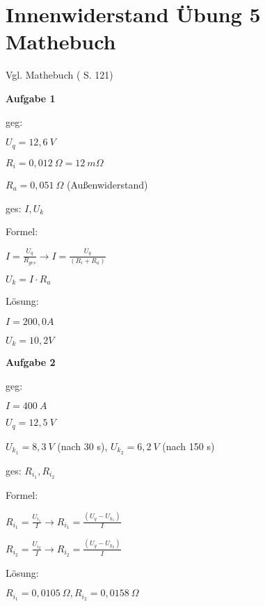 \section{Innenwiderstand Übung 5
Mathebuch}\label{innenwiderstand-uebung-5-mathebuch}

Vgl. Mathebuch (\textcite{elbl:2016:technMa} S. 121)

\textbf{Aufgabe 1}

geg:

$U_q = 12,6~V$

$R_i = 0,012~\Omega = 12~m\Omega$

$R_a = 0,051~\Omega$ (Außenwiderstand)

ges: $I, U_k$

Formel:

$I = \frac{U_q}{R_{ges}} \to I = \frac{U_q}{(R_i + R_a)}$

$U_k = I \cdot R_a$

Lösung:

$I = 200,0 A$

$U_k = 10,2 V$

\textbf{Aufgabe 2}

geg:

$I = 400~A$

$U_q = 12,5~V$

$U_{k_1} = 8,3~V$ (nach 30 s), $U_{k_2} = 6,2~V$ (nach 150 s)

ges: $R_{i_1}, R_{i_2}$

Formel:

$R_{i_1} = \frac{U_{i_1}}{I} \to R_{i_1} = \frac{(U_q - U_{k_1})}{I}$

$R_{i_2} = \frac{U_{i_2}}{I} \to R_{i_2} = \frac{(U_q - U_{k_2})}{I}$

Lösung:

$R_{i_1} = 0,0105~\Omega, R_{i_2} = 0,0158~\Omega$
